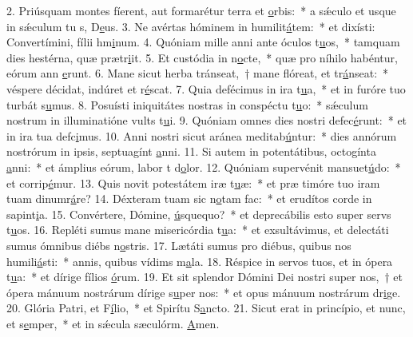 2. Priúsquam montes fíerent, aut formarétur terra et \uline{o}rbis:~* a sǽculo et usque in sǽculum tu s, D\uline{e}us.
3. Ne avértas hóminem in humilit\uline{á}tem:~* et dixísti: Convertímini, fílii hm\uline{i}num.
4. Quóniam mille anni ante óculos t\uline{u}os,~* tamquam dies hestérna, quæ prætr\uline{i}it.
5. Et custódia in n\uline{o}cte,~* quæ pro níhilo habéntur, eórum ann \uline{e}runt.
6. Mane sicut herba tránseat,~† mane flóreat, et tr\uline{á}nseat:~* véspere décidat, indúret et r\uline{é}scat.
7. Quia defécimus in ira t\uline{u}a,~* et in furóre tuo turbát s\uline{u}mus.
8. Posuísti iniquitátes nostras in conspéctu t\uline{u}o:~* sǽculum nostrum in illuminatióne vults t\uline{u}i.
9. Quóniam omnes dies nostri defec\uline{é}runt:~* et in ira tua defc\uline{i}mus.
10. Anni nostri sicut aránea meditab\uline{ú}ntur:~* dies annórum nostrórum in ipsis, septuagínt \uline{a}nni.
11. Si autem in potentátibus, octogínta \uline{a}nni:~* et ámplius eórum, labor t d\uline{o}lor.
12. Quóniam supervénit mansuet\uline{ú}do:~* et corrip\uline{é}mur.
13. Quis novit potestátem iræ t\uline{u}æ:~* et præ timóre tuo iram tuam dinumr\uline{á}re?
14. Déxteram tuam sic n\uline{o}tam fac:~* et erudítos corde in sapint\uline{i}a.
15. Convértere, Dómine, \uline{ú}squequo?~* et deprecábilis esto super servs t\uline{u}os.
16. Repléti sumus mane misericórdia t\uline{u}a:~* et exsultávimus, et delectáti sumus ómnibus diébs n\uline{o}stris.
17. Lætáti sumus pro diébus, quibus nos humili\uline{á}sti:~* annis, quibus vídims m\uline{a}la.
18. Réspice in servos tuos, et in ópera t\uline{u}a:~* et dírige fílios \uline{ó}rum.
19. Et sit splendor Dómini Dei nostri super nos,~† et ópera mánuum nostrárum dírige s\uline{u}per nos:~* et opus mánuum nostrárum dr\uline{i}ge.
20. Glória Patri, et F\uline{í}lio,~* et Spirítu S\uline{a}ncto.
21. Sicut erat in princípio, et nunc, et s\uline{e}mper,~* et in sǽcula sæculórm. \uline{A}men.
